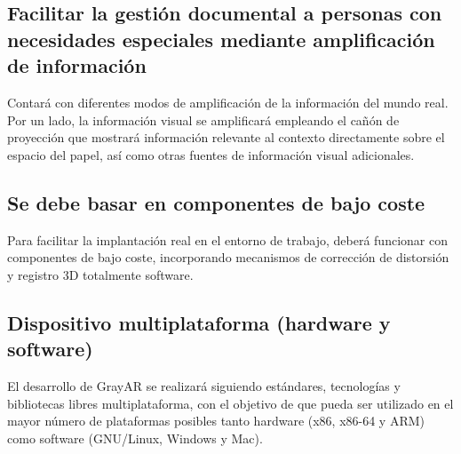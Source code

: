 \subsection{Facilitar la gestión documental a personas con necesidades especiales mediante amplificación de información} 
Contará con diferentes modos de amplificación de la información del mundo real. Por un lado, la información visual se amplificará empleando el cañón de proyección que mostrará información relevante al contexto directamente sobre el espacio del papel, así como otras fuentes de información visual adicionales. 

\subsection{Se debe basar en componentes de bajo coste}
Para facilitar la implantación real en el entorno de trabajo, deberá funcionar con componentes de bajo coste, incorporando mecanismos de corrección de distorsión y registro 3D totalmente software.

\subsection{Dispositivo multiplataforma (hardware y software)}
El desarrollo de GrayAR se realizará siguiendo estándares, tecnologías y bibliotecas libres multiplataforma, con el objetivo de que pueda ser utilizado en el mayor número de plataformas posibles tanto hardware (x86, x86-64 y ARM) como software (GNU/Linux, Windows y Mac).


